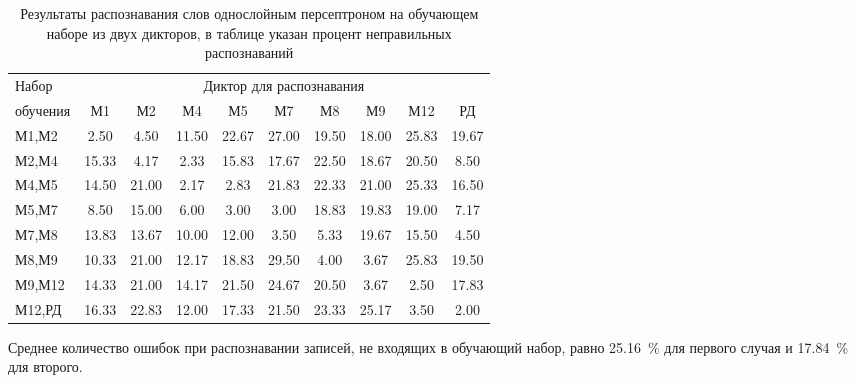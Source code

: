 \begin{table}[h]
	\centering
	\caption{Результаты распознавания слов однослойным персептроном на обучающем наборе из двух дикторов, в таблице указан процент неправильных распознаваний}
	\label{tab:mlp1_dictor2}
	\begin{tabular}{| l | c | c | c | c | c | c | c | c | c |}
		\hline
		Набор & \multicolumn{9}{c|}{Диктор для распознавания} \\
		\hhline{~---------}
		обучения \phantom{0000} & М1    & М2    & М4    & М5    & М7    & М8    & М9    & М12   & РД 	 \\
		\hline
		М1,М2	 &  2.50 &  4.50 & 11.50 & 22.67 & 27.00 & 19.50 & 18.00 & 25.83 & 19.67 \\
		М2,М4	 & 15.33 &  4.17 &  2.33 & 15.83 & 17.67 & 22.50 & 18.67 & 20.50 &  8.50 \\
		М4,М5	 & 14.50 & 21.00 &  2.17 &  2.83 & 21.83 & 22.33 & 21.00 & 25.33 & 16.50 \\
		М5,М7	 &  8.50 & 15.00 &  6.00 &  3.00 &  3.00 & 18.83 & 19.83 & 19.00 &  7.17 \\
		М7,М8	 & 13.83 & 13.67 & 10.00 & 12.00 &  3.50 &  5.33 & 19.67 & 15.50 &  4.50 \\
		М8,М9	 & 10.33 & 21.00 & 12.17 & 18.83 & 29.50 &  4.00 &  3.67 & 25.83 & 19.50 \\
		М9,М12	 & 14.33 & 21.00 & 14.17 & 21.50 & 24.67 & 20.50 &  3.67 &  2.50 & 17.83 \\
		М12,РД	 & 16.33 & 22.83 & 12.00 & 17.33 & 21.50 & 23.33 & 25.17 &  3.50 &  2.00 \\
		\hline
	\end{tabular}
\end{table}

Среднее количество ошибок при распознавании записей, не входящих в обучающий набор, равно 25.16~\% для первого случая и 17.84~\% для второго.

